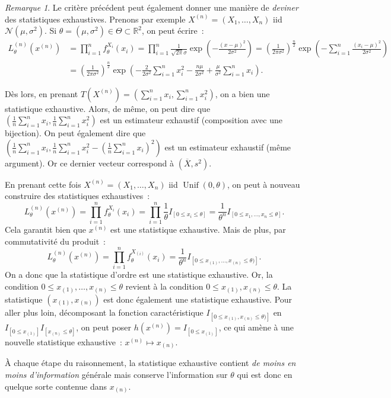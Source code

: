 \documentclass{report}
\DeclareMathOperator{\Unif}{Unif}  %
\newcommand{\Nms}{\mathcal N(\mu, \sigma^2)}
\newcommand{\R}{\mathbb R}
\newcommand{\charfun}[1]{I_{\left[#1\right]}}
\newcommand{\n}{{(n)}}
\theoremstyle{definition}
\theoremstyle{remark}
\newtheorem*{rmq}{Remarque}
\begin{document}
		\begin{rmq} Le critère précédent peut également donner une manière de \textit{deviner} des statistiques exhaustives. Prenons par exemple
		$X^{(n)} = (X_1, \ldots, X_n)$ iid $\Nms$. Si $\theta = (\mu, \sigma^2) \in \Theta \subset \R^2$, on peut écrire~:
		\begin{align*}
			L_\theta^{(n)}(x^{(n)}) &= \prod_{i=1}^nf^{X_i}_\theta(x_i) = \prod_{i=1}^n\frac 1{\sqrt {2\pi}\sigma}\exp\left(-\frac {(x-\mu)^2}{2\sigma^2}\right)
				= \left(\frac 1{2\pi\sigma^2}\right)^{\frac n2}\exp\left(-\sum_{i=1}^n\frac {(x_i-\mu)^2}{2\sigma^2}\right) \\
			&= \left(\frac 1{2\pi\sigma^2}\right)^{\frac n2}\exp\left(-\frac 2{2\sigma^2}\sum_{i=1}^nx_i^2 - \frac {n\mu}{2\sigma^2} + \frac \mu{\sigma^2}\sum_{i=1}^nx_i\right).
		\end{align*}

		Dès lors, en prenant $T(X^{(n)}) = \left(\sum_{i=1}^nx_i, \sum_{i=1}^nx_i^2\right)$, on a bien une statistique exhaustive. Alors, de même, on peut dire que
		$\left(\frac 1n\sum_{i=1}^nx_i, \frac 1n\sum_{i=1}^nx_i^2\right)$ est un estimateur exhaustif (composition avec une bijection). On peut également dire que
		$\left(\frac 1n\sum_{i=1}^nx_i, \frac 1n\sum_{i=1}^nx_i^2 - \left(\frac 1n\sum_{i=1}^nx_i\right)^2\right)$ est un estimateur exhaustif (même argument). Or
		ce dernier vecteur correspond à $(\overline X, s^2)$.

		En prenant cette fois $X^{(n)} = (X_1, \ldots, X_n)$ iid $\Unif(0, \theta)$, on peut à nouveau construire des statistiques exhaustives~:
		\[L_\theta^{(n)}(x^{(n)}) = \prod_{i=1}^nf^{X_i}_\theta(x_i) = \prod_{i=1}^n\frac 1\theta\charfun{0 \leq x_i \leq \theta}
			= \frac 1{\theta^n}\charfun{0 \leq x_1, \ldots, x_n \leq \theta}.\]
		Cela garantit bien que $x^{(n)}$ est une statistique exhaustive. Mais de plus, par commutativité du produit~:
		\[L_\theta^{(n)}(x^{(n)}) = \prod_{i=1}^nf^{X_{(i)}}_\theta(x_i) = \frac 1{\theta^n}\charfun{0 \leq x_{(1)}, \ldots, x_{(n)} \leq \theta)}.\]
		On a donc que la statistique d'ordre est une statistique exhaustive. Or, la condition $0 \leq x_{(1)}, \ldots, x_{(n)} \leq \theta$ revient à la condition
		$0 \leq x_{(1)}, x_{(n)} \leq \theta$. La statistique $(x_{(1)}, x_{(n)})$ est donc également une statistique exhaustive. Pour aller plus loin, décomposant
		la fonction caractéristique $\charfun {0 \leq x_{(1)}, x_{(n)} \leq \theta)}$ en $\charfun {0 \leq x_{(1)}}\charfun{x_{(n)} \leq \theta}$, on peut poser
		$h(x^{(n)}) = \charfun{0 \leq x_{(1)}}$, ce qui amène à une nouvelle statistique exhaustive~: $x^\n \mapsto x_{(n)}$.

		À chaque étape du raisonnement, la statistique exhaustive contient \textit{de moins en moins d'information} générale mais conserve l'information sur $\theta$
		qui est donc en quelque sorte contenue dans $x_{(n)}$.
		\end{rmq}
\end{document}
